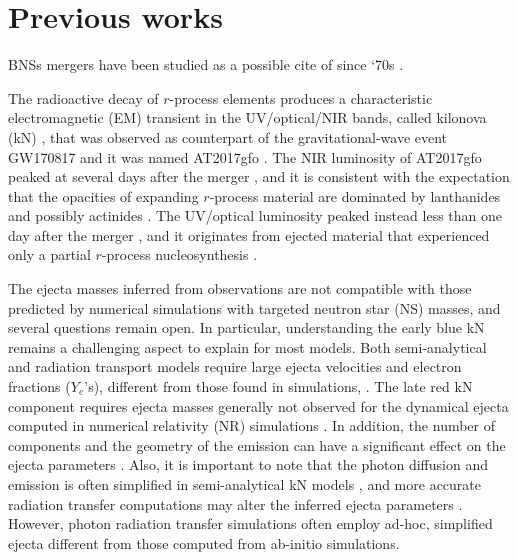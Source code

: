 \section{Previous works}

\acp{BNS} mergers have been studied as a possible cite of \rproc{} \nuc{} 
since `70s \citep{Lattimer:1974a,Symbalisty:1982a,Rosswog:1998hy,Freiburghaus:1999,Rosswog:2005su}. 

The radioactive decay of $r$-process elements produces a
characteristic electromagnetic (EM) transient in the UV/optical/NIR
bands, called kilonova (kN) \citep{Li:1998bw,Kulkarni:2005jw,Metzger:2010sy,Roberts:2011xz,Kasen:2013xka},
that was observed as counterpart of the gravitational-wave event GW170817 \citep{Abbott:2017wuw,Abbott:2017oio,Abbott:2018wiz,Abbott:2018hgk}
and it was named AT2017gfo
\citep{Arcavi:2017xiz,Coulter:2017wya,Drout:2017ijr,Evans:2017mmy,Hallinan:2017woc,Kasliwal:2017ngb,Nicholl:2017ahq,Smartt:2017fuw,Soares-santos:2017lru,Tanvir:2017pws,Troja:2017nqp,Mooley:2018dlz,Ruan:2017bha,Lyman:2018qjg}.
The NIR luminosity of AT2017gfo peaked at several days after the
merger \citep{Chornock:2017sdf}, and it is consistent with the expectation
that the opacities of expanding $r$-process material are dominated by 
lanthanides and possibly actinides \citep{Kasen:2013xka}.  
The UV/optical luminosity peaked instead less than one day after the
merger \citep{Nicholl:2017ahq}, and it originates from ejected material
that experienced only a partial $r$-process nucleosynthesis
\citep{Martin:2015hxa}.

The ejecta masses inferred from observations \citep{Cowperthwaite:2017dyu,Villar:2017wcc,Tanvir:2017pws,Tanaka:2017qxj,Perego:2017wtu,Kawaguchi:2018ptg} are not compatible with those predicted by numerical simulations with targeted neutron star (NS) masses, and several questions remain open. 
In particular, understanding the early blue kN remains a challenging
aspect to explain for most models.
Both semi-analytical and radiation transport
models require large ejecta velocities and electron fractions ($Y_e$'s),
different from those found in simulations,
\citep[\eg][]{Fahlman:2018llv,Nedora:2019jhl}.
The late red kN component requires ejecta masses generally
not observed for the dynamical ejecta computed in numerical relativity (NR) simulations \citep{Radice:2018pdn}. 
In addition, the number of components and the geometry of the emission can have a significant 
effect on the ejecta parameters 
\citep{Perego:2017wtu,Kawaguchi:2018ptg}. Also, it is important to note that the photon diffusion and
emission is often simplified in semi-analytical kN models \citep[\eg][]{Villar:2017wcc,Perego:2017wtu,Siegel:2019mlp}, and  
more accurate radiation transfer computations may alter the inferred ejecta parameters 
\citep{Kawaguchi:2018ptg,Korobkin:2020spe}. However, photon radiation transfer simulations often employ ad-hoc, simplified ejecta different from those computed from ab-initio simulations. 

